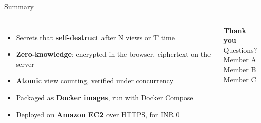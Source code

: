 \documentclass[aspectratio=169,11pt]{beamer}
\newcommand{\memberA}{Member A}
\newcommand{\memberB}{Member B}
\newcommand{\memberC}{Member C}
\newcommand{\hl}[1]{\textcolor{cobalt}{\textbf{#1}}}
\newcommand{\muted}[1]{\textcolor{mist}{#1}}
\begin{document}
\begin{frame}{Summary}
  \begin{columns}[c]
    \begin{itemize}
      \item Secrets that \hl{self-destruct} after N views or T time
      \item \hl{Zero-knowledge}: encrypted in the browser, ciphertext on the server
      \item \hl{Atomic} view counting, verified under concurrency
      \item Packaged as \hl{Docker images}, run with Docker Compose
      \item Deployed on \hl{Amazon EC2} over HTTPS, for INR 0
    \end{itemize}
    \centering
    {\Large\bfseries Thank you}\\[6pt]
    \muted{Questions?}\\[14pt]
    \small \memberA\\\memberB\\\memberC
  \end{columns}
\end{frame}
\end{document}
